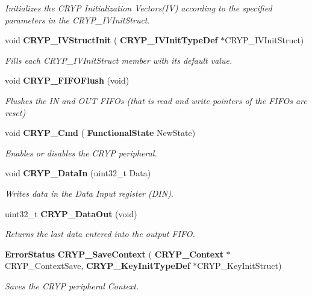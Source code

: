 \begin{DoxyCompactItemize}
\begin{DoxyCompactList}\small\item\em Initializes the C\+R\+YP Initialization Vectors(\+I\+V) according to the specified parameters in the C\+R\+Y\+P\+\_\+\+I\+V\+Init\+Struct. \end{DoxyCompactList}\item 
void \textbf{ C\+R\+Y\+P\+\_\+\+I\+V\+Struct\+Init} (\textbf{ C\+R\+Y\+P\+\_\+\+I\+V\+Init\+Type\+Def} $\ast$C\+R\+Y\+P\+\_\+\+I\+V\+Init\+Struct)
\begin{DoxyCompactList}\small\item\em Fills each C\+R\+Y\+P\+\_\+\+I\+V\+Init\+Struct member with its default value. \end{DoxyCompactList}\item 
void \textbf{ C\+R\+Y\+P\+\_\+\+F\+I\+F\+O\+Flush} (void)
\begin{DoxyCompactList}\small\item\em Flushes the IN and O\+UT F\+I\+F\+Os (that is read and write pointers of the F\+I\+F\+Os are reset) \end{DoxyCompactList}\item 
void \textbf{ C\+R\+Y\+P\+\_\+\+Cmd} (\textbf{ Functional\+State} New\+State)
\begin{DoxyCompactList}\small\item\em Enables or disables the C\+R\+YP peripheral. \end{DoxyCompactList}\item 
void \textbf{ C\+R\+Y\+P\+\_\+\+Data\+In} (uint32\+\_\+t Data)
\begin{DoxyCompactList}\small\item\em Writes data in the Data Input register (D\+IN). \end{DoxyCompactList}\item 
uint32\+\_\+t \textbf{ C\+R\+Y\+P\+\_\+\+Data\+Out} (void)
\begin{DoxyCompactList}\small\item\em Returns the last data entered into the output F\+I\+FO. \end{DoxyCompactList}\item 
\textbf{ Error\+Status} \textbf{ C\+R\+Y\+P\+\_\+\+Save\+Context} (\textbf{ C\+R\+Y\+P\+\_\+\+Context} $\ast$C\+R\+Y\+P\+\_\+\+Context\+Save, \textbf{ C\+R\+Y\+P\+\_\+\+Key\+Init\+Type\+Def} $\ast$C\+R\+Y\+P\+\_\+\+Key\+Init\+Struct)
\begin{DoxyCompactList}\small\item\em Saves the C\+R\+YP peripheral Context. \end{DoxyCompactList}\item 

\end{DoxyCompactItemize}

